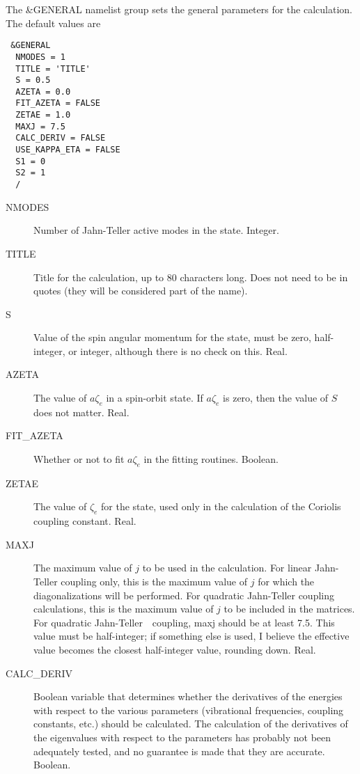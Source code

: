 \documentclass{article}
\newcommand{\JT}{Jahn-Teller\ }
\begin{document}
The \&GENERAL namelist group sets the general parameters for the
calculation. The default values are

\begin{verbatim}
 &GENERAL 
  NMODES = 1
  TITLE = 'TITLE'
  S = 0.5
  AZETA = 0.0
  FIT_AZETA = FALSE
  ZETAE = 1.0
  MAXJ = 7.5
  CALC_DERIV = FALSE
  USE_KAPPA_ETA = FALSE
  S1 = 0
  S2 = 1
  /
\end{verbatim}

\begin{description}

\item[NMODES] Number of Jahn-Teller active modes in the state. Integer.

\item[TITLE] Title for the calculation, up to 80 characters
  long. Does not need to be in quotes (they will be considered part of
  the name). 

\item[S] Value of the spin angular momentum for the state, must be
  zero, half-integer, or integer, although there is no check on this. Real.

\item[AZETA] The value of $a\zeta _e$ in a spin-orbit state. If
  $a\zeta_e$ is zero, then the value of $S$ does not matter. Real.

\item[FIT\_AZETA] Whether or not to fit $a\zeta _e$ in the fitting
  routines. Boolean.

\item[ZETAE] The value of $\zeta _e$ for the state, used only in the
  calculation of the Coriolis coupling constant. Real.

\item[MAXJ] The maximum value of $j$ to be used in the
  calculation. For linear Jahn-Teller coupling only, this is the
  maximum value of $j$ for which the diagonalizations will be
  performed. For quadratic Jahn-Teller coupling calculations, this is
  the maximum value of $j$ to be included in the matrices. For
  quadratic \JT\ coupling, maxj should be at least 7.5. This value
  must be half-integer; if something else is used, I believe the
  effective value becomes the closest half-integer value, rounding
  down. Real.

\item[CALC\_DERIV] Boolean variable that determines whether the
  derivatives of the energies with respect to the various parameters
  (vibrational frequencies, coupling constants, etc.) should be
  calculated. The calculation of the derivatives of the eigenvalues with
  respect to the parameters has probably not been adequately tested,
  and no guarantee is made that they are accurate. Boolean.
  

\end{description}
\end{document}
